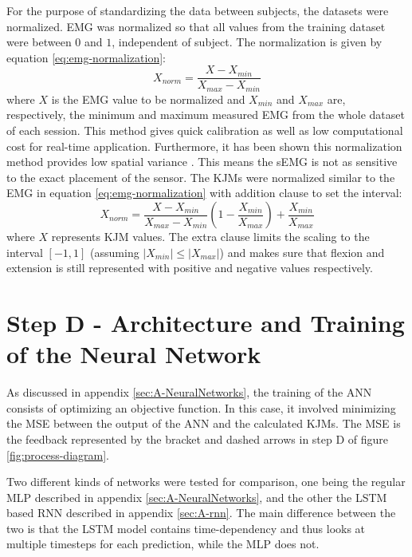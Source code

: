 \documentclass[../main.tex]{subfiles}
\begin{document}
For the purpose of standardizing the data between subjects, the datasets were normalized.
\ac{EMG} was normalized so that all values from the training dataset were between $0$ and $1$, independent of subject.
The normalization is given by equation \ref{eq:emg-normalization}:
\begin{equation}
\label{eq:emg-normalization}
    X_{norm} = \frac{X - X_{min}}{X_{max} - X_{min}}
\end{equation}
where $X$ is the \ac{EMG} value to be normalized and $X_{min}$ and $X_{max}$ are, respectively, the minimum and maximum measured \ac{EMG} from the whole dataset of each session. 
This method gives quick calibration as well as low computational cost for real-time application.
Furthermore, it has been shown this normalization method provides low spatial variance \cite{Cronin2015}.
This means the \ac{sEMG} is not as sensitive to the exact placement of the sensor.
The \acp{KJM} were normalized similar to the \ac{EMG} in equation \ref{eq:emg-normalization} with addition clause to set the interval:
\begin{equation}
\label{eq:moment-normalization}
    X_{norm} = \frac{X - X_{min}}{X_{max} - X_{min}}\left(1 - \frac{X_{min}}{X_{max}}\right) + \frac{X_{min}}{X_{max}}
\end{equation}
where $X$ represents \ac{KJM} values. 
The extra clause limits the scaling to the interval $[-1,1]$ (assuming $\left|X_{min}\right| \leq \left|X_{max}\right|$) and makes sure that flexion and extension is still represented with positive and negative values respectively.

\section{Step D - Architecture and Training of the Neural Network}
As discussed in appendix \ref{sec:A-NeuralNetworks}, the training of the \ac{ANN} consists of optimizing an objective function.
In this case, it involved minimizing the \ac{MSE} between the output of the \ac{ANN} and the calculated \acp{KJM}.
The \ac{MSE} is the feedback represented by the bracket and dashed arrows in step D of figure \ref{fig:process-diagram}.

Two different kinds of networks were tested for comparison, one being the regular \ac{MLP} described in appendix \ref{sec:A-NeuralNetworks}, and the other the \ac{LSTM} based \ac{RNN} described in appendix \ref{sec:A-rnn}.
The main difference between the two is that the \ac{LSTM} model contains time-dependency and thus looks at multiple timesteps for each prediction, while the \ac{MLP} does not.
\end{document}

